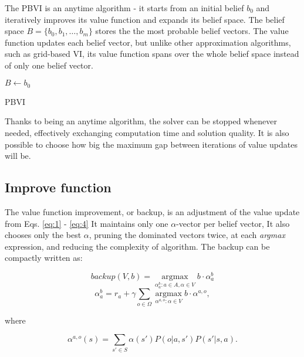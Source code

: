 The PBVI \cite{pbvi} is an anytime algorithm - it starts from an initial belief $b_0$ and iteratively improves its value function and expands its belief space. The belief space $B = \{b_0, b_1, \ldots, b_m\}$ stores the the most probable belief vectors. The value function updates each belief vector, but unlike other approximation algorithms, such as grid-based VI, its value function spans over the whole belief space instead of only one belief vector.

\LinesNumbered
\begin{algorithm}[H]
\SetAlgoLined
$B \xleftarrow{} {b_0}$\\
\caption{PBVI}
\end{algorithm}

Thanks to being an anytime algorithm, the solver can be stopped whenever needed, effectively exchanging computation time and solution quality. It is also possible to choose how big the maximum gap between iterations of value updates will be.


\subsection{Improve function}

The value function improvement, or backup, is an adjustment of the value update from Eqs. \ref{eq:1} - \ref{eq:4} It maintains only one $\alpha$-vector per belief vector, It also chooses only the best $\alpha$, pruning the dominated vectors twice, at each \textit{argmax} expression, and reducing the complexity of algorithm. The backup can be compactly written as:

\begin{equation} \label{eq:5} backup(V, b) = \operatorname*{argmax}_{\alpha_{a}^{b}:a \in A, \alpha \in V} b \cdot \alpha_{a}^{b}\end{equation}
\begin{equation} \label{eq:6} \alpha_{a}^{b} = r_a + \gamma \sum_{o \in \Omega} \operatorname*{argmax}_{\alpha^{a, o}:\alpha \in V} b \cdot \alpha^{a, o},\end{equation}

where

\begin{equation} \label{eq:7} \alpha^{a, o} (s) = \sum_{s' \in S} \alpha (s') P(o|a, s') P(s'| s, a).\end{equation}

